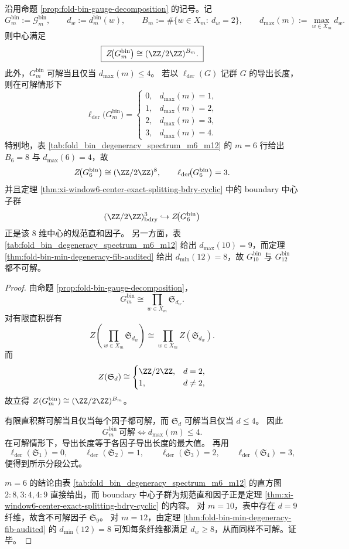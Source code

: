 \begin{theorem}[中心与可解性的纤维判别]\label{thm:xi-foldbin-center-solvable-fiber-criterion}
沿用命题 \ref{prop:fold-bin-gauge-decomposition} 的记号。记
\[
G_m^{\mathrm{bin}}:=\mathcal{G}^{\mathrm{bin}}_m,
\qquad
d_w:=d_m^{\mathrm{bin}}(w),
\qquad
B_m:=\#\{w\in X_m:\ d_w=2\},
\qquad
d_{\max}(m):=\max_{w\in X_m}d_w.
\]
则中心满足
\[
\boxed{\;
Z\!\bigl(G_m^{\mathrm{bin}}\bigr)\cong (\ZZ/2\ZZ)^{B_m}.
\;}
\]
此外，\(G_m^{\mathrm{bin}}\) 可解当且仅当 \(d_{\max}(m)\le 4\)。
若以 \(\ell_{\mathrm{der}}(G)\) 记群 \(G\) 的导出长度，则在可解情形下
\[
\ell_{\mathrm{der}}\!\bigl(G_m^{\mathrm{bin}}\bigr)
=
\begin{cases}
0,& d_{\max}(m)=1,\\
1,& d_{\max}(m)=2,\\
2,& d_{\max}(m)=3,\\
3,& d_{\max}(m)=4.
\end{cases}
\]
特别地，表 \ref{tab:fold_bin_degeneracy_spectrum_m6_m12} 的 \(m=6\) 行给出 \(B_6=8\) 与 \(d_{\max}(6)=4\)，故
\[
Z\!\bigl(G_6^{\mathrm{bin}}\bigr)\cong (\ZZ/2\ZZ)^8,
\qquad
\ell_{\mathrm{der}}\!\bigl(G_6^{\mathrm{bin}}\bigr)=3.
\]
并且定理 \ref{thm:xi-window6-center-exact-splitting-bdry-cyclic} 中的 boundary 中心子群
\[
(\ZZ/2\ZZ)^3_{\mathrm{bdry}}\hookrightarrow Z\!\bigl(G_6^{\mathrm{bin}}\bigr)
\]
正是该 \(8\) 维中心的规范直和因子。
另一方面，表 \ref{tab:fold_bin_degeneracy_spectrum_m6_m12} 给出 \(d_{\max}(10)=9\)，而定理 \ref{thm:fold-bin-min-degeneracy-fib-audited} 给出 \(d_{\min}(12)=8\)，故 \(G_{10}^{\mathrm{bin}}\) 与 \(G_{12}^{\mathrm{bin}}\) 都不可解。
\end{theorem}
\begin{proof}
由命题 \ref{prop:fold-bin-gauge-decomposition}，
\[
G_m^{\mathrm{bin}}
\cong
\prod_{w\in X_m}\mathfrak S_{d_w}.
\]
对有限直积群有
\[
Z\!\left(\prod_{w\in X_m}\mathfrak S_{d_w}\right)
\cong
\prod_{w\in X_m}Z(\mathfrak S_{d_w}).
\]
而
\[
Z(\mathfrak S_d)\cong
\begin{cases}
\ZZ/2\ZZ,& d=2,\\
1,& d\neq 2,
\end{cases}
\]
故立得 \(Z(G_m^{\mathrm{bin}})\cong (\ZZ/2\ZZ)^{B_m}\)。

有限直积群可解当且仅当每个因子都可解，而 \(\mathfrak S_d\) 可解当且仅当 \(d\le 4\)。
因此
\[
G_m^{\mathrm{bin}}\ \text{可解}
\iff
d_{\max}(m)\le 4.
\]
在可解情形下，导出长度等于各因子导出长度的最大值。
再用
\[
\ell_{\mathrm{der}}(\mathfrak S_1)=0,\qquad
\ell_{\mathrm{der}}(\mathfrak S_2)=1,\qquad
\ell_{\mathrm{der}}(\mathfrak S_3)=2,\qquad
\ell_{\mathrm{der}}(\mathfrak S_4)=3,
\]
便得到所示分段公式。

\(m=6\) 的结论由表 \ref{tab:fold_bin_degeneracy_spectrum_m6_m12} 的直方图 \(2:8,3:4,4:9\) 直接给出，而 boundary 中心子群为规范直和因子正是定理 \ref{thm:xi-window6-center-exact-splitting-bdry-cyclic} 的内容。
对 \(m=10\)，表中存在 \(d=9\) 纤维，故含不可解因子 \(\mathfrak S_9\)。
对 \(m=12\)，由定理 \ref{thm:fold-bin-min-degeneracy-fib-audited} 的 \(d_{\min}(12)=8\) 可知每条纤维都满足 \(d_w\ge 8\)，从而同样不可解。证毕。
\end{proof}

